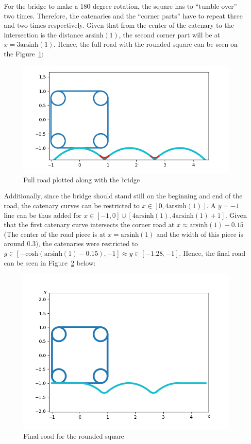 \documentclass[12pt]{article}
\begin{document}
        For the bridge to make a 180 degree rotation, the square has to ``tumble over'' two times. Therefore, the catenaries and the ``corner parts'' have to repeat three and two times respectively. Given that from the center of the catenary to the intersection is the distance $\text{arsinh}(1)$, the second corner part will be at $x=3\text{arsinh}(1)$. Hence, the full road with the rounded square can be seen on the Figure~\ref{fig:bridge_full}:
        \begin{figure}[H]
            \centering
            \includegraphics[width=0.75\linewidth]{images/road_with_square.png}
            \caption{Full road plotted along with the bridge}\label{fig:bridge_full}
        \end{figure}

        Additionally, since the bridge should stand still on the beginning and end of the road, the catenary curves can be restricted to $x \in [0, 4\text{arsinh}(1)]$. A $y=-1$ line can be thus added for $x \in [-1, 0] \cup [4\text{arsinh}(1), 4\text{arsinh}(1)+1]$. Given that the first catenary curve intersects the corner road at $x \approx \text{arsinh}(1) - 0.15$ (The center of the road piece is at $x=\text{arsinh}(1)$ and the width of this piece is around $0.3$), the catenaries were restricted to $y\in [-\text{cosh}(\text{arsinh}(1) - 0.15), -1] \approx y \in [-1.28, -1]$. Hence, the final road can be seen in Figure~\ref{fig:bridge_final} below:

        \begin{figure}[H]
            \centering
            \includegraphics[width=0.9\linewidth]{images/road_square_final.png}
            \caption{Final road for the rounded square}\label{fig:bridge_final}
        \end{figure}
\end{document}
